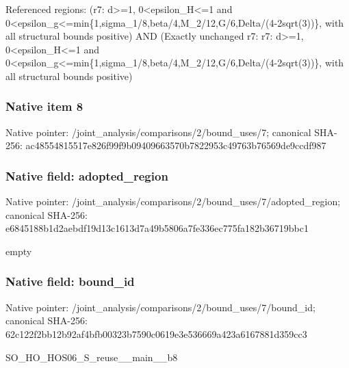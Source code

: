 \documentclass[10pt,a4paper]{article}
\begin{document}
\begingroup\raggedright\sloppy Referenced regions:\allowbreak{} (r7:\allowbreak{} d>=\allowbreak{}1,\allowbreak{} 0<epsilon\_\allowbreak{}H<=\allowbreak{}1 and 0<epsilon\_\allowbreak{}g<=\allowbreak{}min\{1,\allowbreak{}sigma\_\allowbreak{}1/\allowbreak{}8,\allowbreak{}beta/\allowbreak{}4,\allowbreak{}M\_\allowbreak{}2/\allowbreak{}12,\allowbreak{}G/\allowbreak{}6,\allowbreak{}Delta/\allowbreak{}(4-2sqrt(3))\},\allowbreak{} with all structural bounds positive) AND (Exactly unchanged r7:\allowbreak{} r7:\allowbreak{} d>=\allowbreak{}1,\allowbreak{} 0<epsilon\_\allowbreak{}H<=\allowbreak{}1 and 0<epsilon\_\allowbreak{}g<=\allowbreak{}min\{1,\allowbreak{}sigma\_\allowbreak{}1/\allowbreak{}8,\allowbreak{}beta/\allowbreak{}4,\allowbreak{}M\_\allowbreak{}2/\allowbreak{}12,\allowbreak{}G/\allowbreak{}6,\allowbreak{}Delta/\allowbreak{}(4-2sqrt(3))\},\allowbreak{} with all structural bounds positive)\par\endgroup

\subsubsection{Native item 8}
Native pointer: /joint\_\allowbreak{}analysis/comparisons/2/bound\_\allowbreak{}uses/7; canonical SHA-256: ac48554815517e826f99f9b09409663570b7822953c49763b76569de9ccdf987

\subsubsection{Native field: adopted\_\allowbreak{}region}
Native pointer: /joint\_\allowbreak{}analysis/comparisons/2/bound\_\allowbreak{}uses/7/adopted\_\allowbreak{}region; canonical SHA-256: e6845188b1d2aebdf19d13c1613d7a49b5806a7fe336ec775fa182b36719bbc1

\begingroup\raggedright\sloppy empty\par\endgroup

\subsubsection{Native field: bound\_\allowbreak{}id}
Native pointer: /joint\_\allowbreak{}analysis/comparisons/2/bound\_\allowbreak{}uses/7/bound\_\allowbreak{}id; canonical SHA-256: 62c122f2bb12b92af4bfb00323b7590c0619e3e536669a423a6167881d359cc3

\begingroup\raggedright\sloppy SO\_\allowbreak{}HO\_\allowbreak{}HOS06\_\allowbreak{}S\_\allowbreak{}reuse\_\allowbreak{}\_\allowbreak{}main\_\allowbreak{}\_\allowbreak{}b8\par\endgroup
\end{document}
